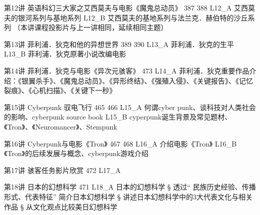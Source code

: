 第12讲 英语科幻三大家之艾西莫夫与电影《魔鬼总动员》
    387 388
    L12_A 艾西莫夫的银河系列与基地系列
    L12_B 艾西莫夫的基地系列与法兰克．赫伯特的沙丘系列
    （本讲课程投影片与上一讲相同，延续相同主题）

第13讲 菲利浦．狄克和他的异想世界
    389 390
    L13_A 菲利浦．狄克的生平
    L13_B 菲利浦．狄克原著小说改编电影

第14讲 菲利浦．狄克与电影《异次元骇客》
    473
    L14_A 菲利浦．狄克重要作品介绍：《银翼杀手》、《魔鬼总动员》、《异形终结》、《强殖入侵》、《关键报告》、《记忆裂痕》、《心机扫描》、《关键下一秒》

第15讲 Cyber​​punk 驭电飞行
    465 466
    L15_A 何谓cyber punk、谈科技对人类社会的影响、cyberpunk source book
    L15_B cyperpunk诞生背景及常见题材、《Tron》、《Neuromancer》、Stempunk

第16讲 Cyber​​punk与电影《Tron》
    467 468
    L16_A 介绍电影《Tron》
    L16_B 《Tron》的后续发展与概念、cyberpunk游戏介绍

第17讲 骇客任务影片欣赏
    472
    L17_A 

第18讲 日本的幻想科学
    471
    L18_A 日本的幻想科学 
        § 透过“ 民族历史经验、传播形式、代表特征” 简介日本幻想科学  
        § 讲述日本幻想科学中的3大代表文化与相关作品
        § 从文化观点比较美日幻想科学